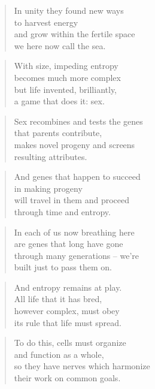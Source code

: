 \documentclass[10pt,a4paper]{article}
\begin{document}
\begin{paracol}{2}
\begin{verse}
In unity they found new ways\\
to harvest energy\\
and grow within the fertile space\\
we here now call the sea.
\end{verse}

\begin{verse}
With size, impeding entropy\\
becomes much more complex\\
but life invented, brilliantly,\\
a game that does it: sex.
\end{verse}

\begin{verse}
Sex recombines and tests the genes\\
that parents contribute,\\
makes novel progeny and screens\\
resulting attributes.
\end{verse}

\begin{verse}
And genes that happen to succeed\\
in making progeny\\
will travel in them and proceed\\
through time and entropy.
\end{verse}

\begin{verse}
In each of us now breathing here\\
are genes that long have gone\\
through many generations – we’re\\
built just to pass them on.
\end{verse}

\begin{verse}
And entropy remains at play.\\
All life that it has bred,\\
however complex, must obey\\
its rule that life must spread.
\end{verse}

\begin{verse}
To do this, cells must organize\\
and function as a whole,\\
so they have nerves which harmonize\\
their work on common goals.
\end{verse}


\end{paracol}
\end{document}

